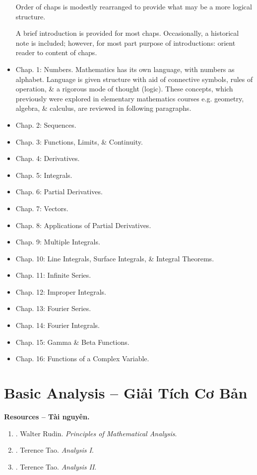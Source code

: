 \documentclass{article}
\begin{document}
\begin{itemize}
	Order of chaps is modestly rearranged to provide what may be a more logical structure.
	
	A brief introduction is provided for most chaps. Occasionally, a historical note is included; however, for most part purpose of introductions: orient reader to content of chaps.
	\item {\sf Chap. 1: Numbers.} Mathematics has its own language, with numbers as alphabet. Language is given structure with aid of connective symbols, rules of operation, \& a rigorous mode of thought (logic). These concepts, which previously were explored in elementary mathematics courses e.g. geometry, algebra, \& calculus, are reviewed in following paragraphs.
	\item {\sf Chap. 2: Sequences.}
	\item {\sf Chap. 3: Functions, Limits, \& Continuity.}
	\item {\sf Chap. 4: Derivatives.}
	\item {\sf Chap. 5: Integrals.}
	\item {\sf Chap. 6: Partial Derivatives.}
	\item {\sf Chap. 7: Vectors.}
	\item {\sf Chap. 8: Applications of Partial Derivatives.}
	\item {\sf Chap. 9: Multiple Integrals.}
	\item {\sf Chap. 10: Line Integrals, Surface Integrals, \& Integral Theorems.}
	\item {\sf Chap. 11: Infinite Series.}
	\item {\sf Chap. 12: Improper Integrals.}
	\item {\sf Chap. 13: Fourier Series.}
	\item {\sf Chap. 14: Fourier Integrals.}
	\item {\sf Chap. 15: Gamma \& Beta Functions.}
	\item {\sf Chap. 16: Functions of a Complex Variable.}
\end{itemize}


\section{Basic Analysis -- Giải Tích Cơ Bản}
\textbf{\textsf{Resources -- Tài nguyên.}}
\begin{enumerate}
	\item \cite{Rudin1976}. {\sc Walter Rudin}. {\it Principles of Mathematical Analysis}.
	
	\item \cite{Tao_analysis_1}. {\sc Terence Tao}. {\it Analysis I}.
	
	\item \cite{Tao_analysis_2}. {\sc Terence Tao}. {\it Analysis II}.
\end{enumerate}
\end{document}
